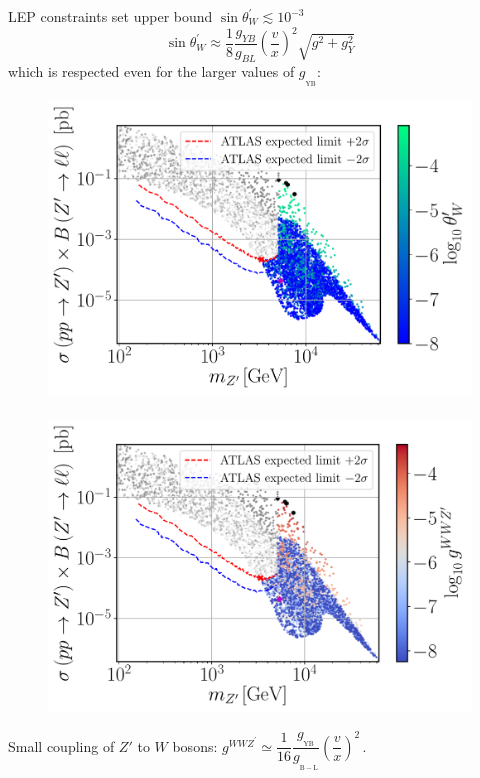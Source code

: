 \documentclass[10pt,xcolor=dvipsnames,mathserif]{beamer}
\renewcommand{\(}{\left(}
\renewcommand{\)}{\right)}
\renewcommand{\[}{\left[}
\renewcommand{\]}{\right]}
\newcommand{\g}[2]{g_{_\mathrm{#1}}^{#2}}
\begin{document}
\begin{frame}
	LEP constraints set upper bound $\sin \theta_W^\prime \lesssim 10^{-3}$
	$$\sin \theta_W^\prime \approx \dfrac{1}{8
	} \dfrac{g_{YB}}{g_{BL}}\(\dfrac{v}{x}\)^2 \sqrt{g^2 + g_Y^2}$$
which is respected even for the larger values of $\g{YB}{}$:	%
\begin{figure}[!h]
	\includegraphics[scale=0.27
	]{mZp_Xsec_twp.pdf}~
	\includegraphics[scale=0.27
]{mZp_Xsec_gWWZp.pdf}	
\end{figure}	
Small coupling of $Z'$ to $W$ bosons: $g^{WWZ^\prime} \simeq \dfrac{1}{16} \dfrac{\g{YB}{}}{\g{B-L}{}} \(\dfrac{v}{x}\)^2\,.$
\end{frame}
\end{document}
